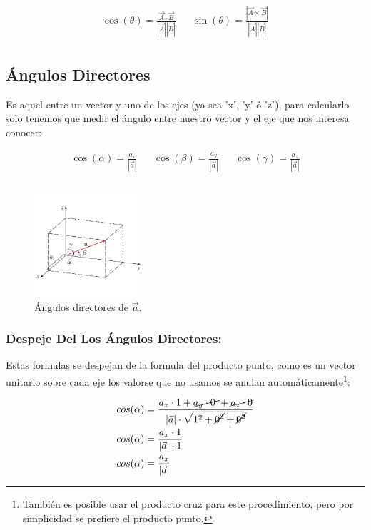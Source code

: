 \documentclass{article}
\begin{document}
\[ \begin{aligned}
\cos(\theta) = \frac{\vec{A} \cdot \vec{B}}{|\vec{A}||\vec{B}|} &&
\sin(\theta) = \frac{|\vec{A}\times\vec{B}|}{|\vec{A}||\vec{B}|} \\
\end{aligned} \]

\subsection{Ángulos Directores}
\label{sec:orga32a267}
Es aquel entre un vector y uno de los ejes (ya sea 'x', 'y' ó 'z'), para calcularlo solo tenemos que medir el ángulo entre nuestro vector y el eje que nos interesa conocer:

\[\begin{aligned}
  \cos(\alpha) = \frac{a_x}{|\vec{a}|} &&
  \cos(\beta)  = \frac{a_y}{|\vec{a}|} &&
  \cos(\gamma) = \frac{a_z}{|\vec{a}|} \\
\end{aligned} \]

\begin{figure}[htbp]
\centering
\includegraphics[width=4cm]{img/angulos-directores.png}
\caption{Ángulos directores de \(\vec{a}\).}
\end{figure}


\subsubsection*{Despeje Del Los Ángulos Directores:}
\label{sec:org476bc5a}
Estas formulas se despejan de la formula del producto punto, como es un vector unitario sobre cada eje los valorse que no usamos se anulan automáticamente\footnote{También es posible usar el producto cruz para este procedimiento, pero por simplicidad se prefiere el producto punto.}:

\[\begin{aligned}
  cos(\alpha) &= \frac{a_x \cdot 1 + \cancel{a_y \cdot 0~} + \cancel{a_z \cdot 0} }{|\vec{a}| \cdot \sqrt{1^2+\cancel{0^2}+\cancel{0^2}}} \\
  cos(\alpha) &= \frac{a_x \cdot 1}{|\vec{a}| \cdot 1} \\
  cos(\alpha) &= \frac{a_x}{|\vec{a}|} \\
\end{aligned} \]
\end{document}
